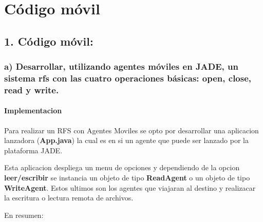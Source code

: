 \documentclass[11pt]{extarticle}
\begin{document}
    
    
    

\newpage
\tableofcontents
\newpage

    
    

    
    \hypertarget{cuxf3digo-muxf3vil}{%
\section{Código móvil}\label{cuxf3digo-muxf3vil}}

    \hypertarget{cuxf3digo-muxf3vil}{%
\subsection{1. Código móvil:}\label{cuxf3digo-muxf3vil}}

    \hypertarget{a-desarrollar-utilizando-agentes-muxf3viles-en-jade-un-sistema-rfs-con-las-cuatro-operaciones-buxe1sicas-open-close-read-y-write.}{%
\subsubsection{a) Desarrollar, utilizando agentes móviles en JADE, un
sistema rfs con las cuatro operaciones básicas: open, close, read y
write.}\label{a-desarrollar-utilizando-agentes-muxf3viles-en-jade-un-sistema-rfs-con-las-cuatro-operaciones-buxe1sicas-open-close-read-y-write.}}

    \hypertarget{implementacion}{%
\paragraph{Implementacion}\label{implementacion}}

Para realizar un RFS con Agentes Moviles se opto por desarrollar una
aplicacion lanzadora (\textbf{App.java}) la cual es en si un agente que
puede ser lanzado por la plataforma JADE.

Esta aplicacion despliega un menu de opciones y dependiendo de la opcion
\textbf{leer/escribir} se instancia un objeto de tipo \textbf{ReadAgent}
o un objeto de tipo \textbf{WriteAgent}. Estos ultimos son los agentes
que viajaran al destino y realizacar la escritura o lectura remota de
archivos.

En resumen:
\end{document}
